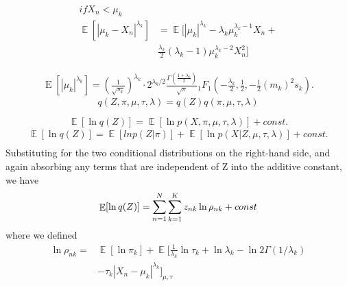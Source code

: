 \documentclass[conference]{IEEEtran}
\begin{document}
\begin{equation}
    \begin{split}
        if X_n < \mu_k\\
        \mathop{\mathbb{E}}[|\mu_k - X_n|^{\lambda_k}] &= \mathop{\mathbb{E}}[|\mu_k|^{\lambda_k} - \lambda_k \mu_k^{\lambda_k - 1} X_n + \\
        &\frac{\lambda_k}{2} (\lambda_k - 1) \mu_k^{\lambda_k - 2} X_n^2]
    \end{split}
\end{equation}

\begin{equation}
    \begin{split}
        {\displaystyle \operatorname {E} \left[|\mu_k|^{\lambda_k}\right]=(\frac{1}{\sqrt{s_k}})^{\lambda_k}\cdot 2^{\lambda_k/2}{\frac {\Gamma \left({\frac {1+\lambda_k}{2}}\right)}{\sqrt {\pi }}}{}_{1}F_{1}\left(-{\frac {\lambda_k}{2}},{\frac {1}{2}},-{\frac {1}{2}}\left({m_k}\right)^{2} s_k \right).}    
    \end{split}
\end{equation}
\begin{equation}
    q(Z, \pi, \mu, \tau, \lambda) = q(Z)q(\pi, \mu, \tau, \lambda)
\end{equation}

\begin{equation}
    \mathop{\mathbb{E}}[\ln q(Z)] = \mathop{\mathbb{E}}[\ln p(X, \pi,\mu, \tau, \lambda)] + const.
\end{equation}
\begin{equation}
    \begin{split}
        \mathop{\mathbb{E}}[\ln q(Z)] = \mathop{\mathbb{E}}[ln p(Z|\pi)]+\mathop{\mathbb{E}}[\ln p(X|Z,\mu, \tau, \lambda)] + const.\\
    \end{split}
\end{equation}
Substituting for the two conditional distributions on the right-hand side, and again absorbing any terms that are independent of Z into the additive constant, we have
\begin{equation}
    \mathop{\mathbb{E}}[\ln q(Z)] =  \sum_{\mathclap{n=1}}^{N} \sum_{\mathclap{k=1}}^{K}z_{nk} \ln \rho_{nk} + const
\end{equation}
where we defined 
\begin{equation}
    \begin{split}
        \ln \rho_{nk} = &\mathop{\mathbb{E}}[\ln \pi_k] + \mathop{\mathbb{E}}[\frac{1}{\lambda_k} \ln \tau_k + \ln \lambda_k - \ln 2\Gamma(1/\lambda_k)\\
        & - \tau_k |X_n - \mu_k|^{\lambda_k}]_{\mu, \tau}    
    \end{split}
\end{equation}
\end{document}
